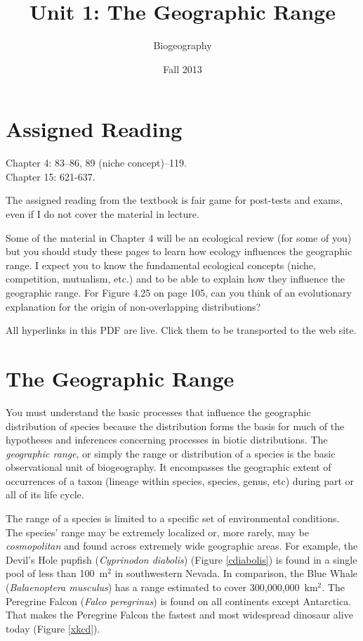 \documentclass[12pt, oneside]{article}   	%
\title{Unit 1: The Geographic Range}
\author{Biogeography}
\date{Fall 2013}							%
\begin{document}
\maketitle
\section{Assigned Reading}
Chapter 4: 83--86, 89 (niche concept)--119. \\
Chapter 15: 621-637.

The assigned reading from the textbook is fair game for post-tests and exams, even if I do not cover the material in  lecture.

Some of the material in Chapter 4 will be an ecological review (for some of you) but you should study these pages to learn how ecology influences the geographic range.  I expect you to know the fundamental ecological concepts (niche, competition, mutualism, etc.) and to be able to explain how they influence the geographic range.  For Figure 4.25 on page 105, can you think of an evolutionary explanation for the origin of non-overlapping distributions?

All hyperlinks in this PDF are live. Click them to be transported to the web site.

\section{The Geographic Range}

You must understand the basic processes that influence the geographic distribution of species because the distribution forms the basis for much of the hypotheses and inferences concerning processes in biotic distributions. The \emph{geographic range}, or simply the range or distribution of a species is the basic observational unit of biogeography. It encompasses the geographic extent of occurrences of a taxon (lineage within species, species, genus, etc) during part or all of its life cycle. 

The range of a species is limited to a specific set of environmental conditions. The species' range may be  extremely localized or, more rarely, may be \emph{cosmopolitan} and found across extremely wide geographic areas. For example, the Devil's Hole pupfish (\emph {Cyprinodon diabolis}) (Figure \ref{cdiabolis}) is found in a single pool of less than 100~m$^2$ in southwestern Nevada. In comparison, the Blue Whale (\emph{Balaenoptera musculus}) has a range estimated to cover 300,000,000~km$^2$.  The Peregrine Falcon (\emph{Falco peregrinus}) is found on all continents except Antarctica. That makes the Peregrine Falcon  the fastest and most widespread dinosaur alive today (Figure \ref{xkcd}).
\end{document}
